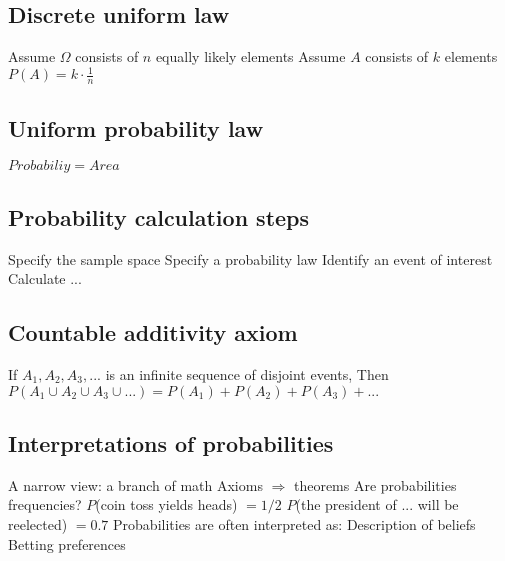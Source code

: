 {{{{\subsection{Discrete uniform law}
\begin{outline}
\1 Assume $\Omega$ consists of $n$ equally likely elements
\1 Assume $A$ consists of $k$ elements
\1 $P(A) = k \cdot \frac{1}{n}$
\end{outline}

\subsection{Uniform probability law}
\begin{outline}
\1 $Probabiliy = Area$
\end{outline}

\subsection{Probability calculation steps}
\begin{outline}
\1 Specify the sample space
\1 Specify a probability law
\1 Identify an event of interest
\1 Calculate ...
\end{outline}

\subsection{Countable additivity axiom}
\begin{outline}
\1 If $A_1, A_2, A_3, ...$ is an infinite sequence of disjoint events,
  \2 Then $P(A_1 \cup A_2 \cup A_3 \cup ...) = P(A_1) + P(A_2) + P(A_3) + ...$
\end{outline}

\subsection{Interpretations of probabilities}
\begin{outline}
\1 A narrow view: a branch of math
  \2 Axioms $\Rightarrow$ theorems
\1 Are probabilities frequencies?
  \2 $P$(coin toss yields heads) $= 1/2$
  \2 $P$(the president of ... will be reelected) $= 0.7$
\1 Probabilities are often interpreted as:
  \2 Description of beliefs
  \2 Betting preferences
\end{outline}

}}}}
